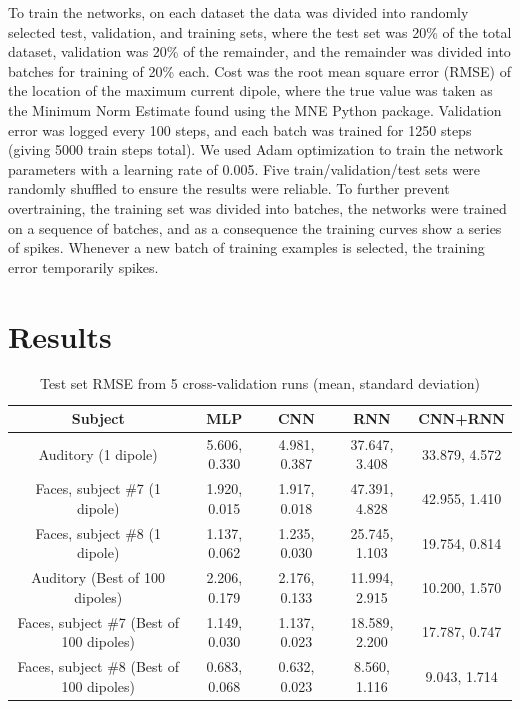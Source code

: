 \documentclass[journal]{IEEEtran}
\begin{document}
To train the networks, on each dataset the data was divided into randomly selected test, validation, and training sets, where the test set was 20\% of the total dataset, validation was 20\% of the remainder, and the remainder was divided into batches for training of 20\% each. Cost was the root mean square error (RMSE) of the location of the maximum current dipole, where the true value was taken as the Minimum Norm Estimate found using the MNE Python package. Validation error was logged every 100 steps, and each batch was trained for 1250 steps (giving 5000 train steps total). We used Adam optimization to train the network parameters \cite{kingma2014adam} with a learning rate of 0.005. Five train/validation/test sets were randomly shuffled to ensure the results were reliable. To further prevent overtraining, the training set was divided into batches, the networks were trained on a sequence of batches, and as a consequence the training curves show a series of spikes. Whenever a new batch of training examples is selected, the training error temporarily spikes.

\section{Results}

\begin{table}[h!]
  \centering
  \caption{Test set RMSE from 5 cross-validation runs (mean, standard deviation)}
  \begin{tabular}{c||c|c|c|c}
    \hline
    Subject & MLP & CNN & RNN & CNN+RNN\\
    \hline
    \hline
    Auditory (1 dipole) & 5.606, 0.330 & 4.981, 0.387 & 37.647, 3.408 & 33.879, 4.572 \\
    \hline
    Faces, subject \#7 (1 dipole) &  1.920, 0.015 & 1.917, 0.018 & 47.391, 4.828 & 42.955, 1.410 \\
    \hline
    Faces, subject \#8 (1 dipole) &  1.137, 0.062 & 1.235, 0.030 & 25.745, 1.103 & 19.754, 0.814 \\
    \hline
    Auditory (Best of 100 dipoles) & 2.206, 0.179 & 2.176, 0.133 & 11.994, 2.915 & 10.200, 1.570 \\
    \hline
    Faces, subject \#7 (Best of 100 dipoles) &  1.149, 0.030 & 1.137, 0.023 & 18.589, 2.200 & 17.787, 0.747 \\
    \hline
    Faces, subject \#8 (Best of 100 dipoles) &  0.683, 0.068 & 0.632, 0.023 & 8.560, 1.116 & 9.043, 1.714 \\
    \hline
  \end{tabular}
  \label{tab:results}
\end{table}
\end{document}
